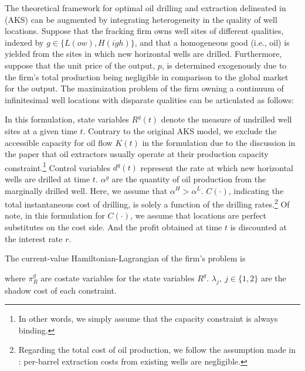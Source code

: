 The theoretical framework for optimal oil drilling and extraction delineated in \cite{Hotelling-under-Pressure_AKS_2018} (AKS) can be augmented by integrating heterogeneity in the quality of well locations. Suppose that the fracking firm owns well sites of different qualities, indexed by $g \in \{L(ow), H(igh)\}$, and that a homogeneous good (i.e., oil) is yielded from the sites in which new horizontal wells are drilled. Furthermore, suppose that the unit price of the output, $p$, is determined exogenously due to the firm's total production being negligible in comparison to the global market for the output. The maximization problem of the firm owning a continuum of infinitesimal well locations with disparate qualities can be articulated as follows:

In this formulation, state variables $R^{g}(t)$ denote the measure of undrilled well sites at a given time $t$. Contrary to the original AKS model, we exclude the accessible capacity for oil flow $K(t)$ in the formulation due to the discussion in the paper that oil extractors usually operate at their production capacity constraint.\footnote{In other words, we simply assume that the capacity constraint is always binding.} Control variables $d^{g}(t)$ represent the rate at which new horizontal wells are drilled at time $t$. $\alpha^{g}$ are the quantity of oil production from the marginally drilled well. Here, we assume that $\alpha^{H} > \alpha^{L}$. $C(\cdot)$, indicating the total instantaneous cost of drilling, is solely a function of the drilling rates.\footnote{Regarding the total cost of oil production, we follow the assumption made in \cite{Hotelling-under-Pressure_AKS_2018}: per-barrel extraction costs from existing wells are negligible.} Of note, in this formulation for $C(\cdot)$, we assume that locations are perfect substitutes on the cost side. And the profit obtained at time $t$ is discounted at the interest rate $r$. 

The current-value Hamiltonian-Lagrangian of the firm's problem is

where $\pi^{g}_{R}$ are costate variables for the state variables $R^{g}$. $\lambda_{j}, \ j \in \{1, 2\}$ are the shadow cost of each constraint.

